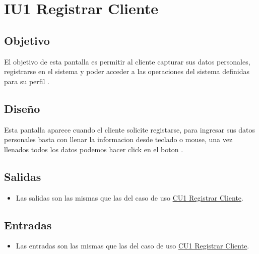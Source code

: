 \section{IU1 Registrar Cliente}

\subsection{Objetivo}
	\cdtInstrucciones  El objetivo de esta pantalla es permitir al cliente capturar sus datos personales, registrarse en el sistema y poder acceder a las operaciones del sistema definidas para su perfil .


\subsection{Diseño}
	\cdtInstrucciones Esta pantalla  aparece cuando el cliente solicite registarse, para ingresar sus datos personales basta con llenar la informacion desde teclado o mouse, una vez llenados todos los datos podemos hacer click en el boton  . 



\subsection{Salidas}

	

	\begin{itemize}
		\item Las salidas son las mismas que las del caso de uso \hyperlink{CU1}{CU1 Registrar Cliente}.
	\end{itemize}
	
\subsection{Entradas}

	\begin{itemize}
		\item Las entradas son las mismas que las del caso de uso \hyperlink{CU1}{CU1 Registrar Cliente}.
	\end{itemize}

